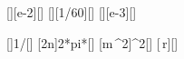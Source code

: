 [\cm][e-2][\meter]
[\per\minute][1/60][\per\second]
[\gram][e-3][\kilogram]

[]{1/\nX}[\second]
[2\pi n]{2*pi*\nX}[\radps]
[m\,\omega^2]{\mX*\omX^2}[\Npm]
[\omega\,r]{\omX*\rpX}[\mps]
